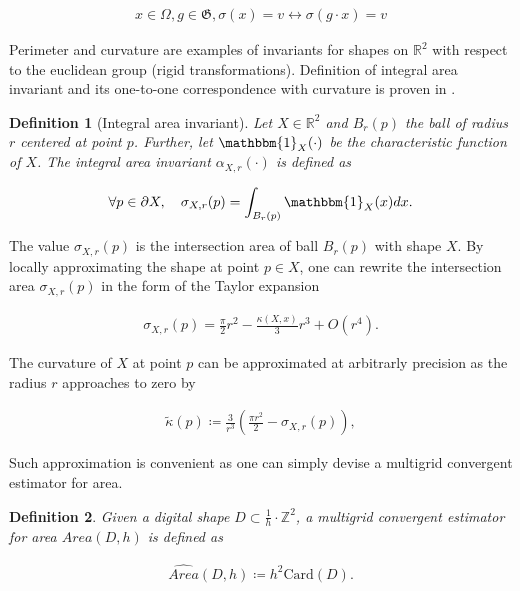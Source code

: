\documentclass[runningheads]{llncs}
\newtheorem{ddef}{Definition}
\begin{document}
		\begin{align*}
			x \in \Omega, g \in \mathfrak{G}, \sigma(x) = v \longleftrightarrow \sigma(g \cdot x ) = v
		\end{align*}
		
		Perimeter and curvature are examples of invariants for shapes on $\mathbb{R}^2$ with respect to the euclidean group (rigid transformations). Definition of integral area invariant and its one-to-one correspondence with curvature is proven in \cite{manay04}.


\begin{ddef}[Integral area invariant]
	Let $X \in \mathbb{R}^2$ and $B_r(p)$ the ball of radius $r$ centered at point $p$. Further, let $\mathbbm{1}_X(\cdot)$ be the characteristic function of $X$. The integral area invariant $\alpha_{X,r}(\cdot)$ is defined as
	
	\begin{align*}
		\forall p \in \partial X, \quad \sigma_{X,r}(p) = \int_{B_r(p)}{ \mathbbm{1}_X(x) dx}.
	\end{align*}
\end{ddef}


	The value $\sigma_{X,r}(p)$ is the intersection area of ball $B_r(p)$ with shape $X$. By locally approximating the shape at point $p \in X$, one can rewrite the intersection area $\sigma_{X,r}(p)$ in the form of the Taylor expansion \cite{pottman09}
	
		\begin{align*}
			\sigma_{X,r}(p) = \frac{\pi}{2}r^2 - \frac{\kappa(X,x)}{3}r^3 + O(r^4).
		\end{align*}
		
	The curvature of $X$ at point $p$ can be approximated at arbitrarly precision as the radius $r$ approaches to zero by
	
	\begin{align}
		\tilde{\kappa}(p) \coloneqq \frac{3}{r^3}\left( \frac{\pi r^2}{2} - \sigma_{X,r}(p) \right),
		\label{eq:curvature_approximation}
	\end{align}
	
	Such approximation is convenient as one can simply devise a multigrid convergent estimator for area.

	\begin{ddef}	
		Given a digital shape $D \subset \frac{1}{h} \cdot \mathbb{Z}^2$, a multigrid convergent estimator for area $\widehat{Area}(D,h)$ is defined as	
		
		\begin{align}
			\widehat{Area}(D,h) \coloneqq h^2\text{Card}\left( D \right).			
			\label{eq:digital_estimator_area}
		\end{align}

	\end{ddef}
	
\end{document}
